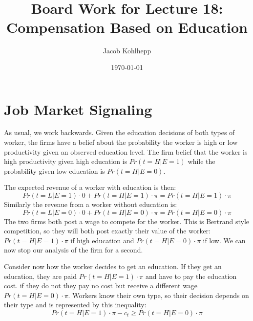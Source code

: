 \documentclass{article}
\title{Board Work for Lecture 18: Compensation Based on Education}
\author{Jacob Kohlhepp}
\date{\today}
\begin{document}
\maketitle


\section{Job Market Signaling}

As usual, we work backwards. Given the education decisions of both types of worker, the firms have a belief about the probability the worker is high or low productivity given an observed education level. The firm belief that the worker is high productivity given high education is $Pr(t=H|E=1)$ while the probability given low education is $Pr(t=H|E=0)$.

The expected revenue of a worker with education is then:
\[Pr(t=L|E=1) \cdot 0 + Pr(t=H|E=1)\cdot \pi =Pr(t=H|E=1)\cdot \pi\]
Similarly the revenue from a worker without education is:
\[Pr(t=L|E=0) \cdot 0 + Pr(t=H|E=0)\cdot \pi =Pr(t=H|E=0)\cdot \pi\]
The two firms both post a wage to compete for the worker. This is Bertrand style competition, so they will both post exactly their value of the worker: $Pr(t=H|E=1)\cdot \pi$ if high education and $Pr(t=H|E=0)\cdot \pi$ if low. We can now stop our analysis of the firm for a second.

Consider now how the worker decides to get an education. If they get an education, they are paid $Pr(t=H|E=1)\cdot \pi$ and have to pay the education cost. if they do not they pay no cost but receive a different wage $Pr(t=H|E=0)\cdot \pi$. Workers know their own type, so their decision depends on their type and is represented by this inequality:
\[Pr(t=H|E=1)\cdot \pi - c_t \geq Pr(t=H|E=0)\cdot \pi\]
\end{document}
